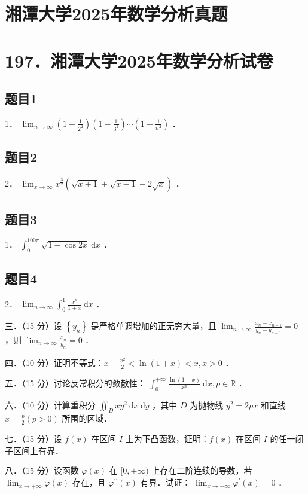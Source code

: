 \documentclass{article}
\begin{document}
\section*{湘潭大学2025年数学分析真题}
\section*{197．湘潭大学2025年数学分析试卷}

\subsection{题目1}
1． \(\lim _{n \rightarrow \infty}\left(1-\frac{1}{2^{2}}\right)\left(1-\frac{1}{3^{2}}\right) \cdots\left(1-\frac{1}{n^{2}}\right)\) ．

\subsection{题目2}
2． \(\lim _{x \rightarrow \infty} x^{\frac{3}{2}}(\sqrt{x+1}+\sqrt{x-1}-2 \sqrt{x})\) ．

\subsection{题目3}
1． \(\int_{0}^{100 \pi} \sqrt{1-\cos 2 x} \mathrm{~d} x\) ．

\subsection{题目4}
2． \(\lim _{n \rightarrow \infty} \int_{0}^{1} \frac{x^{n}}{1+x} \mathrm{~d} x\) ．

三．（15 分）设 \(\left\{y_{n}\right\}\) 是严格单调增加的正无穷大量，且 \(\lim _{n \rightarrow \infty} \frac{x_{n}-x_{n-1}}{y_{n}-y_{n-1}}=0\) ，则 \(\lim _{n \rightarrow \infty} \frac{x_{n}}{y_{n}}=0\) ．

四．（10 分）证明不等式：\(x-\frac{x^{2}}{2}<\ln (1+x)<x, x>0\) ．

五．（15 分）讨论反常积分的敛散性： \(\int_{0}^{+\infty} \frac{\ln (1+x)}{x^{p}} \mathrm{~d} x, p \in \mathbb{R}\) ．

六．（10 分）计算重积分 \(\iint_{D} x y^{2} \mathrm{~d} x \mathrm{~d} y\) ，其中 \(D\) 为抛物线 \(y^{2}=2 p x\) 和直线 \(x=\frac{p}{2}(p>0)\) 所围的区域．

七．（15 分）设 \(f(x)\) 在区间 \(I\) 上为下凸函数，证明：\(f(x)\) 在区间 \(I\) 的任一闭子区间上有界．

八．（15 分）设函数 \(\varphi(x)\) 在 \([0,+\infty)\) 上存在二阶连续的导数，若 \(\lim _{x \rightarrow+\infty} \varphi(x)\) 存在，且 \(\varphi^{\prime \prime}(x)\) 有界．试证： \(\lim _{x \rightarrow+\infty} \varphi^{\prime}(x)=0\) ．
\end{document}
